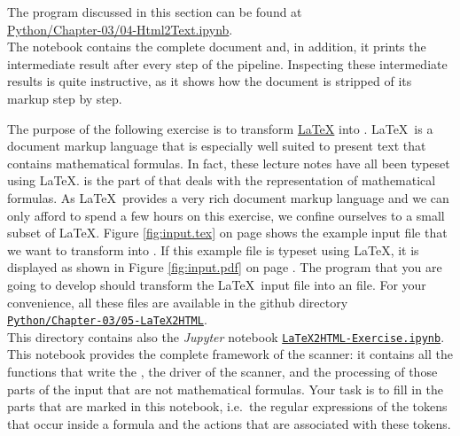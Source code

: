 \noindent
The program discussed in this section can be found at
\\[0.2cm]
\hspace*{1.3cm}
\href{https://github.com/karlstroetmann/Formal-Languages/blob/master/Python/Chapter-03/04-Html2Text.ipynb}{Python/Chapter-03/04-Html2Text.ipynb}.
\\[0.2cm]
The notebook contains the complete  document and, in addition, it prints the intermediate result
after every step of the pipeline.  Inspecting these intermediate results is quite instructive, as it shows how
the document is stripped of its markup step by step.

\exerciseEng\label{exercise:latex-to-mathml}
The purpose of the following exercise is to transform \href{http://www.latex-project.org}{\LaTeX} into 
\href{https://www.tutorialspoint.com/mathml/index.htm}{}.  \LaTeX\ is a document markup language
that is especially well suited to present text that contains mathematical formulas.  In fact, these
lecture notes have all been typeset using \LaTeX.   is the part of  that
deals with the representation of mathematical formulas.  As \LaTeX\ provides a very rich
document markup language and we can only afford to spend a few hours on this exercise, we confine
ourselves to a small subset of \LaTeX.  Figure \ref{fig:input.tex} on page \pageref{fig:input.tex}
shows the example input file that we want to transform into .  If this example file is
typeset using \LaTeX, it is displayed as shown in Figure \ref{fig:input.pdf} on page
\pageref{fig:input.pdf}.  The program that you are going to develop should transform the \LaTeX\ input file into
an  file.  For your convenience, all these files are available in the github directory 
\\[0.2cm]
\hspace*{1.3cm}
\href{https://github.com/karlstroetmann/Formal-Languages/tree/master/Python/Chapter-03/05-LaTeX2HTML}{\texttt{Python/Chapter-03/05-LaTeX2HTML}}.
\\[0.2cm]
This directory contains also the \textsl{Jupyter} notebook 
\href{https://github.com/karlstroetmann/Formal-Languages/blob/master/Python/Chapter-03/05-LaTeX2HTML/LaTeX2HTML-Exercise.ipynb}{\texttt{LaTeX2HTML-Exercise.ipynb}}.
This notebook provides the complete framework of the scanner: it contains all the functions that write the
, the driver of the scanner, and the processing of those parts of the input that are not
mathematical formulas.  Your task is to fill in the parts that are marked in this notebook, i.e.\ the regular
expressions of the tokens that occur inside a formula and the actions that are associated with these tokens.

